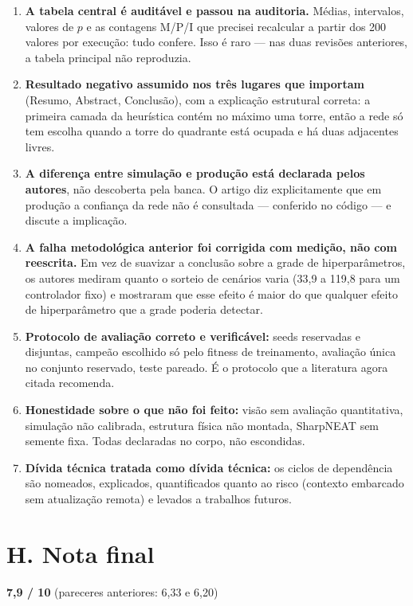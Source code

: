 \documentclass[11pt,a4paper]{article}
\begin{document}
\begin{enumerate}
  \item \textbf{A tabela central é auditável e passou na auditoria.} Médias, intervalos, valores de
  $p$ e as contagens M/P/I que precisei recalcular a partir dos 200 valores por execução: tudo
  confere. Isso é raro --- nas duas revisões anteriores, a tabela principal não reproduzia.
  \item \textbf{Resultado negativo assumido nos três lugares que importam} (Resumo, Abstract,
  Conclusão), com a explicação estrutural correta: a primeira camada da heurística contém no máximo
  uma torre, então a rede só tem escolha quando a torre do quadrante está ocupada e há duas
  adjacentes livres.
  \item \textbf{A diferença entre simulação e produção está declarada pelos autores}, não descoberta
  pela banca. O artigo diz explicitamente que em produção a confiança da rede não é consultada ---
  conferido no código --- e discute a implicação.
  \item \textbf{A falha metodológica anterior foi corrigida com medição, não com reescrita.} Em vez de
  suavizar a conclusão sobre a grade de hiperparâmetros, os autores mediram quanto o sorteio de
  cenários varia (33,9 a 119,8 para um controlador fixo) e mostraram que esse efeito é maior do que
  qualquer efeito de hiperparâmetro que a grade poderia detectar.
  \item \textbf{Protocolo de avaliação correto e verificável:} seeds reservadas e disjuntas, campeão
  escolhido só pelo fitness de treinamento, avaliação única no conjunto reservado, teste pareado. É
  o protocolo que a literatura agora citada recomenda.
  \item \textbf{Honestidade sobre o que não foi feito:} visão sem avaliação quantitativa, simulação
  não calibrada, estrutura física não montada, SharpNEAT sem semente fixa. Todas declaradas no
  corpo, não escondidas.
  \item \textbf{Dívida técnica tratada como dívida técnica:} os ciclos de dependência são nomeados,
  explicados, quantificados quanto ao risco (contexto embarcado sem atualização remota) e levados a
  trabalhos futuros.
\end{enumerate}

\section*{H. Nota final}

\begin{center}
\Large\textbf{7,9 / 10} \quad\normalsize (pareceres anteriores: 6,33 e 6,20)
\end{center}
\end{document}
